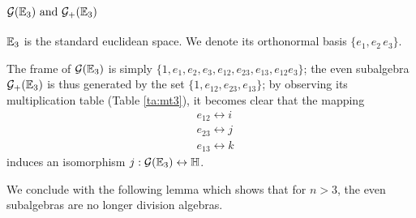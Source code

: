 \subsection{$\G(\E_3)\ \mathrm{and}\ \G_+(\E_3)$}
$\mathbb{E}_3$ is the standard euclidean space. We denote its orthonormal basis $\{e_1, e_2\, e_3\}$.

The frame of $\mathcal{G}(\mathbb{E}_3)$ is simply $\{1, e_1, e_2, e_3, e_{12}, e_{23}, e_{13}, e_{12}e_3\}$; the even subalgebra $\mathcal{G}_+(\mathbb{E}_3)$ is thus generated by the set $\{1, e_{12}, e_{23}, e_{13}\}$; by observing its multiplication table (Table \ref{ta:mt3}), it becomes clear that the mapping
\begin{align*}
	&e_{12} \leftrightarrow i \\
	&e_{23} \leftrightarrow j \\
	&e_{13} \leftrightarrow k 
\end{align*}
induces an isomorphism $j : \mathcal{G}(\mathbb{E}_3) \leftrightarrow \mathbb{H}$.



We conclude with the following lemma which shows that for $n > 3$, the even subalgebras are no longer division algebras.




